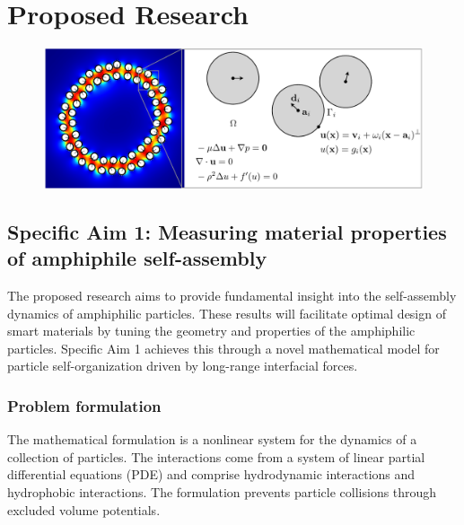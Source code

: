 \section{Proposed Research}
\label{sec:proposed-work}
\begin{center}
  \begin{figure}
      \includegraphics[width=1\textwidth]{figures/SpecificAim1/Domain.pdf}
  \end{figure}
\end{center}


\subsection{Specific Aim 1: Measuring material properties of amphiphile
  self-assembly}
\label{subsec:specific_aim_1}

The proposed research aims to provide fundamental insight into the
self-assembly dynamics of amphiphilic particles. These results will
facilitate optimal design of smart materials by tuning the geometry and
properties of the amphiphilic particles.
Specific Aim 1 achieves this through a novel mathematical model
for particle self-organization driven by long-range interfacial forces. 

\subsubsection{Problem formulation}
The mathematical formulation is a nonlinear system 
for the dynamics of a collection of particles. The 
interactions come from a system of linear partial differential equations
(PDE) and comprise hydrodynamic interactions and hydrophobic interactions.
The formulation prevents particle collisions through excluded volume
potentials. 

